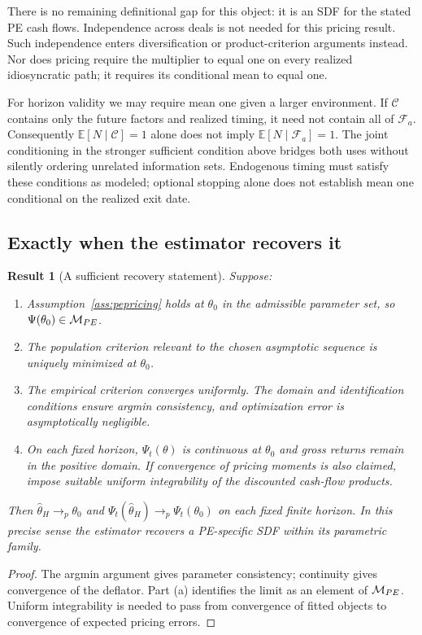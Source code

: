 \documentclass[11pt]{article}
\newcommand{\E}{\mathbb{E}}
\theoremstyle{plain}
\newtheorem{result}{Result}[section]
\theoremstyle{definition}
\begin{document}
There is no remaining definitional gap for this object: it is an SDF for the stated PE cash flows. Independence across deals is not needed for this pricing result. Such independence enters diversification or product-criterion arguments instead. Nor does pricing require the multiplier to equal one on every realized idiosyncratic path; it requires its conditional mean to equal one.

For horizon validity we may require mean one given a larger environment. If $\mathcal C$ contains only the future factors and realized timing, it need not contain all of $\mathcal F_a$. Consequently $\E[N\mid\mathcal C]=1$ alone does not imply $\E[N\mid\mathcal F_a]=1$. The joint conditioning in the stronger sufficient condition above bridges both uses without silently ordering unrelated information sets. Endogenous timing must satisfy these conditions as modeled; optional stopping alone does not establish mean one conditional on the realized exit date.

\subsection{Exactly when the estimator recovers it}

\begin{result}[A sufficient recovery statement]
\label{res:recovery}
Suppose:
\begin{enumerate}[label=(\alph*)]
\item Assumption~\ref{ass:pepricing} holds at $\theta_0$ in the admissible parameter set, so $\Psi(\theta_0)\in\mathcal{M}_{PE}$.
\item The population criterion relevant to the chosen asymptotic sequence is uniquely minimized at $\theta_0$.
\item The empirical criterion converges uniformly. The domain and identification conditions ensure argmin consistency, and optimization error is asymptotically negligible.
\item On each fixed horizon, $\Psi_t(\theta)$ is continuous at $\theta_0$ and gross returns remain in the positive domain. If convergence of pricing moments is also claimed, impose suitable uniform integrability of the discounted cash-flow products.
\end{enumerate}
Then $\hat\theta_H\to_p\theta_0$ and $\Psi_t(\hat\theta_H)\to_p\Psi_t(\theta_0)$ on each fixed finite horizon. In this precise sense the estimator recovers a PE-specific SDF within its parametric family.
\end{result}
\begin{proof}
The argmin argument gives parameter consistency; continuity gives convergence of the deflator. Part (a) identifies the limit as an element of $\mathcal{M}_{PE}$. Uniform integrability is needed to pass from convergence of fitted objects to convergence of expected pricing errors.
\end{proof}
\end{document}
